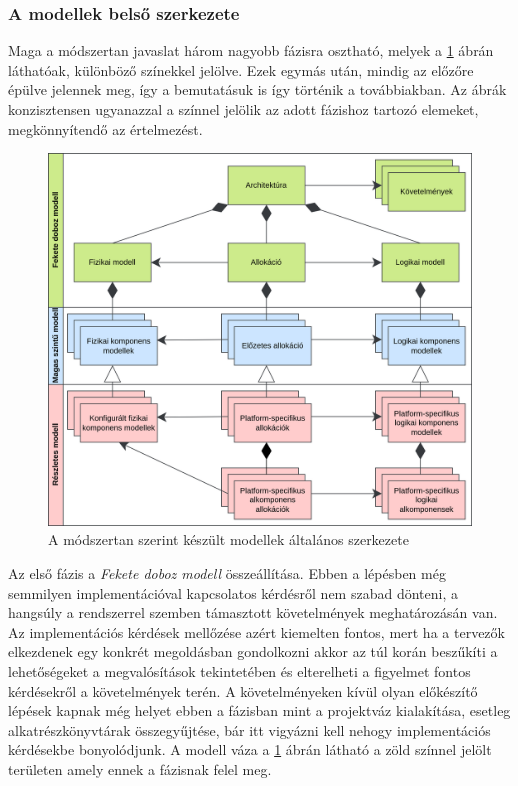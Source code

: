         \subsubsection{A modellek belső szerkezete} \label{sec:ModellekSzerkezete}
        Maga a módszertan javaslat három nagyobb fázisra osztható, melyek a \ref{fig:ModellStruktúra} ábrán láthatóak, különböző színekkel jelölve. Ezek egymás után, mindig az előzőre épülve jelennek meg, így a bemutatásuk is így történik a továbbiakban.
        Az ábrák konzisztensen ugyanazzal a színnel jelölik az adott fázishoz tartozó elemeket, megkönnyítendő az értelmezést.
        \begin{figure}[!ht]
            \centering
            \includegraphics[width=150mm, keepaspectratio]{figures/AllocationBased2HU.drawio.png}
            \caption{A módszertan szerint készült modellek általános szerkezete} 
            \label{fig:ModellStruktúra}
        \end{figure}

        Az első fázis a \emph{Fekete doboz modell} összeállítása. Ebben a lépésben még semmilyen implementációval kapcsolatos kérdésről nem szabad dönteni, a hangsúly a rendszerrel szemben támasztott követelmények meghatározásán van.
        Az implementációs kérdések mellőzése azért kiemelten fontos, mert ha a tervezők elkezdenek egy konkrét megoldásban gondolkozni akkor az túl korán beszűkíti a lehetőségeket a megvalósítások tekintetében és elterelheti a figyelmet fontos kérdésekről a követelmények terén.
        A követelményeken kívül olyan előkészítő lépések kapnak még helyet ebben a fázisban mint a projektváz kialakítása, esetleg alkatrészkönyvtárak összegyűjtése, bár itt vigyázni kell nehogy implementációs kérdésekbe bonyolódjunk.
        A modell váza a \ref{fig:ModellStruktúra} ábrán látható a zöld színnel jelölt területen amely ennek a fázisnak felel meg.
        
